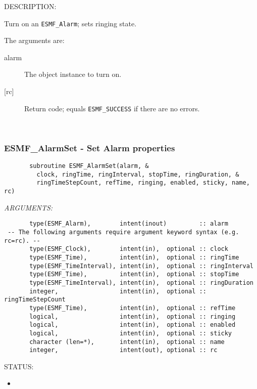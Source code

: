 {\sf DESCRIPTION:\\ }


       Turn on an {\tt ESMF\_Alarm}; sets ringing state.
  
       The arguments are:
       \begin{description}
       \item[alarm]
            The object instance to turn on.
       \item[{[rc]}]
            Return code; equals {\tt ESMF\_SUCCESS} if there are no errors.
       \end{description}
   
 
\mbox{}\hrulefill\ 
 
\subsubsection [ESMF\_AlarmSet] {ESMF\_AlarmSet - Set Alarm properties}


 
\begin{verbatim}       subroutine ESMF_AlarmSet(alarm, &
         clock, ringTime, ringInterval, stopTime, ringDuration, &
         ringTimeStepCount, refTime, ringing, enabled, sticky, name, rc)
 \end{verbatim}{\em ARGUMENTS:}
\begin{verbatim}       type(ESMF_Alarm),        intent(inout)         :: alarm
 -- The following arguments require argument keyword syntax (e.g. rc=rc). --
       type(ESMF_Clock),        intent(in),  optional :: clock
       type(ESMF_Time),         intent(in),  optional :: ringTime
       type(ESMF_TimeInterval), intent(in),  optional :: ringInterval
       type(ESMF_Time),         intent(in),  optional :: stopTime
       type(ESMF_TimeInterval), intent(in),  optional :: ringDuration
       integer,                 intent(in),  optional :: ringTimeStepCount
       type(ESMF_Time),         intent(in),  optional :: refTime
       logical,                 intent(in),  optional :: ringing
       logical,                 intent(in),  optional :: enabled
       logical,                 intent(in),  optional :: sticky
       character (len=*),       intent(in),  optional :: name
       integer,                 intent(out), optional :: rc
 \end{verbatim}
{\sf STATUS:}
   \begin{itemize}
   \item{}
   \end{itemize}
  
